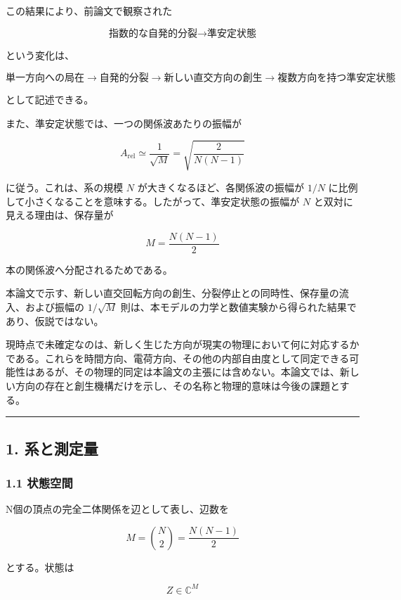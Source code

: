 \documentclass[
  a4paper,
]{ltjsarticle}
\begin{document}
この結果により、前論文で観察された

\[
\text{指数的な自発的分裂}
\longrightarrow
\text{準安定状態}
\]

という変化は、

\[
\boxed{
\text{単一方向への局在}
\longrightarrow
\text{自発的分裂}
\longrightarrow
\text{新しい直交方向の創生}
\longrightarrow
\text{複数方向を持つ準安定状態}
}
\]

として記述できる。

また、準安定状態では、一つの関係波あたりの振幅が

\[
A_{\mathrm{rel}}
\simeq
\frac{1}{\sqrt{M}}
=
\sqrt{\frac{2}{N(N-1)}}
\]

に従う。これは、系の規模 \(N\) が大きくなるほど、各関係波の振幅が
\(1/N\)
に比例して小さくなることを意味する。したがって、準安定状態の振幅が \(N\)
と双対に見える理由は、保存量が

\[
M=\frac{N(N-1)}{2}
\]

本の関係波へ分配されるためである。

本論文で示す、新しい直交回転方向の創生、分裂停止との同時性、保存量の流入、および振幅の
\(1/\sqrt{M}\)
則は、本モデルの力学と数値実験から得られた結果であり、仮説ではない。

現時点で未確定なのは、新しく生じた方向が現実の物理において何に対応するかである。これらを時間方向、電荷方向、その他の内部自由度として同定できる可能性はあるが、その物理的同定は本論文の主張には含めない。本論文では、新しい方向の存在と創生機構だけを示し、その名称と物理的意味は今後の課題とする。

\begin{center}\rule{0.5\linewidth}{0.5pt}\end{center}

\subsection{1. 系と測定量}\label{ux7cfbux3068ux6e2cux5b9aux91cf}

\subsubsection{1.1 状態空間}\label{ux72b6ux614bux7a7aux9593}

N個の頂点の完全二体関係を辺として表し、辺数を

\[
M=\binom{N}{2}=\frac{N(N-1)}{2}
\]

とする。状態は

\[
Z\in\mathbb C^M
\]
\end{document}
